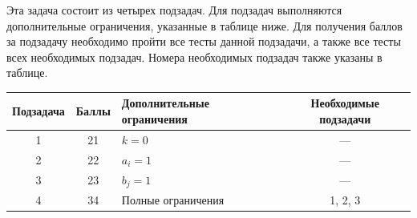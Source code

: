 Эта задача состоит из четырех подзадач. Для подзадач выполняются дополнительные ограничения, указанные в таблице ниже. Для получения баллов за подзадачу необходимо пройти все тесты данной подзадачи, а также все тесты всех необходимых подзадач. Номера необходимых подзадач также указаны в таблице.

\begin{center}
\renewcommand{\arraystretch}{1.5}
\begin{tabular}{|c|c|p{}|c|}
\hline
Подзадача & Баллы & Дополнительные ограничения & Необходимые подзадачи
\\ \hline
1 & 21 & $k = 0$ & {---}
\\ \hline

2 & 22 & $a_i = 1$ & {---}
\\ \hline

3 & 23 & $b_j = 1$ & {---}
\\ \hline
4 & 34 & Полные ограничения & 1, 2, 3
\\ \hline

\end{tabular}

\end{center}